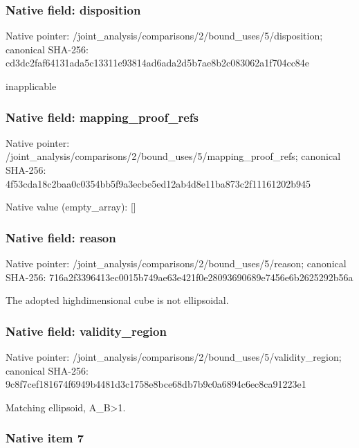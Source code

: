 \documentclass[10pt,a4paper]{article}
\begin{document}
\subsubsection{Native field: disposition}


Native pointer: /joint\_analysis/comparis\allowbreak{}ons/2/bound\_uses/5/dispo\allowbreak{}sition; canonical SHA-256: cd3dc2faf64131ada5c13311\allowbreak{}e93814ad6ada2d5b7ae8b2c0\allowbreak{}83062a1f704cc84e


inapplicable


\subsubsection{Native field: mapping\_proof\_refs}


Native pointer: /joint\_analysis/comparis\allowbreak{}ons/2/bound\_uses/5/mappi\allowbreak{}ng\_proof\_refs; canonical SHA-256: 4f53cda18c2baa0c0354bb5f\allowbreak{}9a3ecbe5ed12ab4d8e11ba87\allowbreak{}3c2f11161202b945



Native value (empty\_array): []



\subsubsection{Native field: reason}


Native pointer: /joint\_analysis/comparis\allowbreak{}ons/2/bound\_uses/5/reaso\allowbreak{}n; canonical SHA-256: 716a2f3396413ec0015b749a\allowbreak{}e63e421f0e28093690689e74\allowbreak{}56e6b2625292b56a


The adopted highdimensional cube is not ellipsoidal.


\subsubsection{Native field: validity\_region}


Native pointer: /joint\_analysis/comparis\allowbreak{}ons/2/bound\_uses/5/valid\allowbreak{}ity\_region; canonical SHA-256: 9c8f7cef181674f6949b4481\allowbreak{}d3c1758e8bce68db7b9c0a68\allowbreak{}94c6ec8ca91223e1


Matching ellipsoid, A\_B>1.


\subsubsection{Native item 7}
\end{document}
